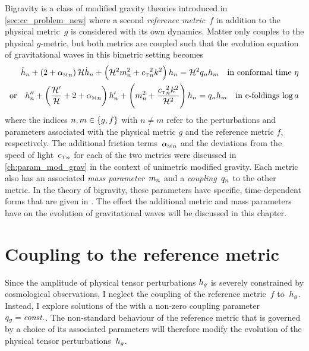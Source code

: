 \documentclass[12pt,parskip=half]{scrreprt}
\begin{document}
Bigravity is a class of modified gravity theories introduced in \autoref{sec:cc_problem_new} where a second \emph{reference metric}~\(f\) in addition to the physical metric~\(g\) is considered with its own dynamics. Matter only couples to the physical \(g\)-metric, but both metrics are coupled such that the evolution equation of gravitational waves in this bimetric setting becomes \citep{Amendola2015}
\begin{subequations}\label{eq:evolution_bimetric}
\begin{align}
	\ddconf{h}\ofmetr{n} + \del{2 + \alphaMofmetr{n}} \Hconf \dconf{h}\ofmetr{n} + \del{\Hconf^2 \mofmetr{n}^2 + \cTofmetr{n}^2 k^2} h\ofmetr{n} = \Hconf^2 \qofmetr{n} h\ofmetr{m} \quad \text{in conformal time \(\conft\)} \\
    \text{or} \quad \ddefold{h}\ofmetr{n} + \del{\frac{\defold{\Hconf}}{\Hconf} + 2 + \alphaMofmetr{n}} \defold{h}\ofmetr{n} + \del{\mofmetr{n}^2 + \frac{\cTofmetr{n}^2 k^2}{\Hconf^2}} h\ofmetr{n} = \qofmetr{n} h\ofmetr{m} \quad \text{in e-foldings \(\efold\)}
\end{align}
\end{subequations}
where the indices \(n,m \in \cbr{g,f}\) with \(n \neq m\) refer to the perturbations and parameters associated with the physical metric \(g\) and the reference metric \(f\), respectively. The additional friction terms~\({\alpha_{\textnormal{\tiny{M}}}}_{n}\) and the deviations from the speed of light~\({c_{\textnormal{\tiny{T}}}}_{n}\) for each of the two metrics were discussed in \autoref{ch:param_mod_grav} in the context of unimetric modified gravity. Each metric also has an associated \emph{mass parameter}~\(m_{n}\) and a \emph{coupling}~\(q_{n}\) to the other metric. In the theory of bigravity, these parameters have specific, time-dependent forms that are given in \cite{Amendola2015}. The effect the additional metric and mass parameters have on the evolution of gravitational waves will be discussed in this chapter.

\section{Coupling to the reference metric}\label{sec:bimetric_coupling}

Since the amplitude of physical tensor perturbations \(h_{g}\) is severely constrained by cosmological observations, I neglect the coupling of the reference metric~\(f\) to~\(h_{g}\). Instead, I explore solutions of the  with a non-zero coupling parameter~\(q_{g}=\textnormal{\textit{const.}}\). The non-standard behaviour of the reference metric that is governed by a choice of its associated parameters will therefore modify the evolution of the physical tensor perturbations~\(h_{g}\). 
\end{document}
